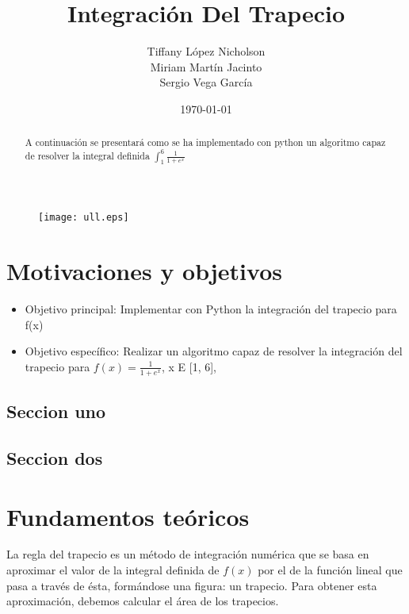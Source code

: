 \documentclass{article}
\begin{document}
  \begin{figure}[lt]
    \texttt{[image: ull.eps]}
  \end{figure}
  \title{Integración Del Trapecio}
  \author{Tiffany López Nicholson \\ Miriam Martín Jacinto \\ Sergio Vega García}
  \date{\today}
  \maketitle

  \begin{abstract}
    \begin{center}
       A continuación se presentará como se ha implementado con python un algoritmo capaz de resolver la integral definida $\int_{1}^{6} \frac{1}{1+e^x}$
    \end{center}
  \end{abstract}
  \pagebreak


  \tableofcontents
  \pagebreak
  
  
  \section{Motivaciones y objetivos}
    \begin{itemize}
      \item Objetivo principal: Implementar con Python la integración del trapecio para f(x)
      \item Objetivo específico: Realizar un algoritmo capaz de resolver la integración del trapecio para $ f(x) = \frac{1}{1 + e^{x}}$, x E [1, 6],
    \end{itemize}
    \subsection{Seccion uno} %
    \subsection{Seccion dos} %
  \pagebreak


  \section{Fundamentos teóricos}
    La regla del trapecio es un método de integración numérica que se basa en aproximar el valor de la integral definida de $f(x)$ por el de la función lineal que pasa a través de ésta, formándose una figura: un trapecio. Para obtener esta aproximación, debemos calcular el área de los trapecios.
    
\end{document}
